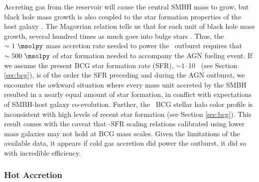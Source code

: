 \documentclass[11pt, preprint]{aastex}
\begin{document}
Accreting gas from the reservoir will cause the central SMBH mass to
grow, but black hole mass growth is also coupled to the star formation
properties of the host galaxy \citep[\eg][]{1995ARA&A..33..581K,
  2000ApJ...539L...9F}. The Magorrian relation \citep{magorrian} tells
us that for each unit of black hole mass growth, several hundred times
as much goes into bulge stars
\citep[\eg][]{2004ApJ...604L..89H}. Thus, the $\sim 1 ~\msolpy$ mass
accretion rate needed to power the \rbs\ outburst requires that $\sim
500 ~\msolpy$ of star formation needed to accompany the AGN fueling
event. If we assume the present BCG star formation rate (SFR), $\sim
1$--10 \msolpy\ (see Section \ref{sec:bcg}), is of the order the SFR
preceding and during the AGN outburst, we encounter the awkward
situation where every mass unit accreted by the SMBH resulted in a
nearly equal amount of star formation, in conflict with expectations
of SMBH-host galaxy co-evolution. Further, the \rbs\ BCG stellar halo
color profile is inconsistent with high levels of recent star
formation (see Section \ref{sec:bcg}). This result comes with the
caveat that \mbh-SFR scaling relations calibrated using lower mass
galaxies may not hold at BCG mass scales. Given the limitations of the
available data, it appears if cold gas accretion did power the
outburst, it did so with incredible efficiency.

\subsubsection{Hot Accretion}
\end{document}
